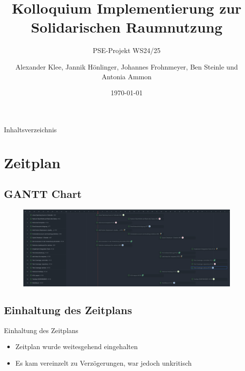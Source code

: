 \documentclass{sdqbeamer}
\title[Solidarische Raumnutzung Implementierung]{Kolloquium Implementierung zur Solidarischen Raumnutzung}
\subtitle{PSE-Projekt WS24/25}
\author[]{Alexander Klee, Jannik Hönlinger, Johannes Frohnmeyer, Ben Steinle und Antonia Ammon}
\date{\today}
\begin{document}
     
    \KITtitleframe
    
    \begin{frame}{Inhaltsverzeichnis}
    \tableofcontents
    \end{frame}
    
    \section{Zeitplan}
    
    \subsection{GANTT Chart}
    \begin{frame}{\insertsubsectionhead}
        \begin{figure}
            \centering
            \includegraphics[width=1\linewidth]{tasks.png}
            \label{fig:enter-label}
        \end{figure}
    \end{frame}
    \subsection{Einhaltung des Zeitplans}
    \begin{frame}{Einhaltung des Zeitplans}
        \begin{itemize}
            \item Zeitplan wurde weitesgehend eingehalten
            \item Es kam vereinzelt zu Verzögerungen, war jedoch unkritisch
        \end{itemize}
    \end{frame}
    
    
\end{document}

